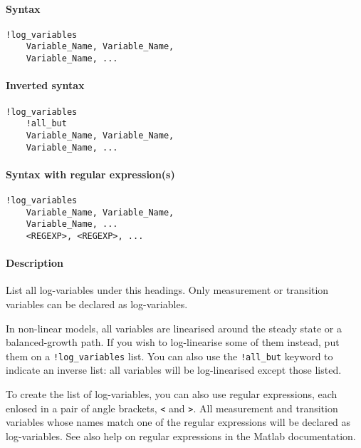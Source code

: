 


	\paragraph{Syntax}\label{syntax}

\begin{verbatim}
!log_variables
    Variable_Name, Variable_Name, 
    Variable_Name, ...
\end{verbatim}

\paragraph{Inverted syntax}\label{inverted-syntax}

\begin{verbatim}
!log_variables
    !all_but
    Variable_Name, Variable_Name, 
    Variable_Name, ...
\end{verbatim}

\paragraph{Syntax with regular
expression(s)}\label{syntax-with-regular-expressions}

\begin{verbatim}
!log_variables
    Variable_Name, Variable_Name, 
    Variable_Name, ...
    <REGEXP>, <REGEXP>, ...
\end{verbatim}

\paragraph{Description}\label{description}

List all log-variables under this headings. Only measurement or
transition variables can be declared as log-variables.

In non-linear models, all variables are linearised around the steady
state or a balanced-growth path. If you wish to log-linearise some of
them instead, put them on a \texttt{!log\_variables} list. You can also
use the \texttt{!all\_but} keyword to indicate an inverse list: all
variables will be log-linearised except those listed.

To create the list of log-variables, you can also use regular
expressions, each enlosed in a pair of angle brackets,
\texttt{\textless{}} and \texttt{\textgreater{}}. All measurement and
transition variables whose names match one of the regular expressions
will be declared as log-variables. See also help on regular expressions
in the Matlab documentation.

